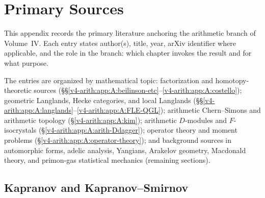 \chapter{Primary Sources}
\label{v4-arith:app:primary-sources}

This appendix records the primary literature anchoring the
arithmetic branch of Volume~IV. Each entry states author(s),
title, year, arXiv identifier where applicable, and the role
in the branch: which chapter invokes the result and for what
purpose.

The entries are organized by mathematical topic: factorization
and homotopy-theoretic sources (\S\S\ref{v4-arith:app:A:beilinson-etc}--\ref{v4-arith:app:A:costello});
geometric Langlands, Hecke categories, and local Langlands
(\S\S\ref{v4-arith:app:A:langlands}--\ref{v4-arith:app:A:FLE-QGL});
arithmetic Chern--Simons and arithmetic topology
(\S\ref{v4-arith:app:A:kim});
arithmetic $D$-modules and $F$-isocrystals
(\S\ref{v4-arith:app:A:arith-Ddagger});
operator theory and moment problems
(\S\ref{v4-arith:app:A:operator-theory});
and background sources in automorphic forms, adelic analysis,
Yang\-ians, Arakelov geometry, Macdonald theory, and primon-gas
statistical mechanics (remaining sections).

\section{Kapranov and Kapranov--Smirnov}
\label{v4-arith:app:A:kapranov}

